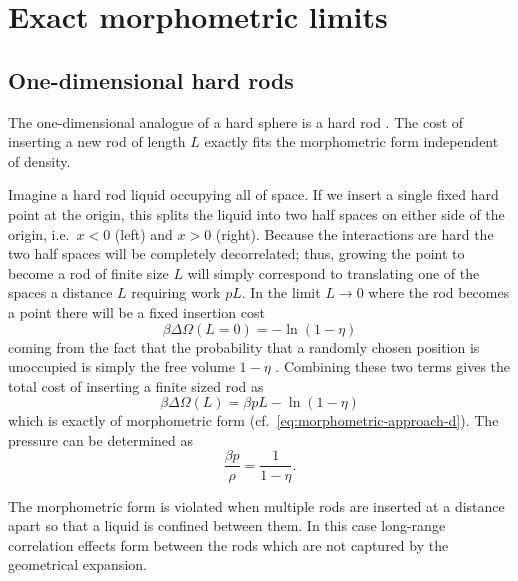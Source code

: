 \documentclass[11pt,twoside]{report}
\begin{document}
\section{Exact morphometric limits}

\subsection{One-dimensional hard rods}
\label{sec:hard-rods}

The one-dimensional analogue of a hard sphere is a hard rod
.
The cost of inserting a new rod of length $L$ exactly fits the morphometric form independent of density.

Imagine a hard rod liquid occupying all of space.
If we insert a single fixed hard point at the origin, this splits the liquid into two half spaces on either side of the origin, i.e.\ $x < 0$ (left) and $x > 0$ (right).
Because the interactions are hard the two half spaces will be completely decorrelated; thus, growing the point to become a rod of finite size $L$ will simply correspond to translating one of the spaces a distance $L$ requiring work $p L$.
In the limit $L \to 0$ where the rod becomes a point there will be a fixed insertion cost
\begin{equation*}
  \beta \Delta \Omega(L=0) = -\ln{(1-\eta)}
\end{equation*}
coming from the fact that the probability that a randomly chosen position is unoccupied is simply the free volume $1-\eta$ \cite{ReissJCP1959}.
Combining these two terms gives the total cost of inserting a finite sized rod as
\begin{equation}\label{eq:hard-rods-morphometric}
  \beta \Delta \Omega(L) = \beta p L - \ln{(1-\eta)}
\end{equation}
which is exactly of morphometric form (cf.\ \eqref{eq:morphometric-approach-d}).
The pressure can be determined as \cite{TonksPR1936}
\begin{equation}\label{eq:hard-rods-eos}
  \frac{\beta p}{\rho} = \frac{1}{1 - \eta}.
\end{equation}

The morphometric form is violated when multiple rods are inserted at a distance apart so that a liquid is confined between them.
In this case long-range correlation effects form between the rods which are not captured by the geometrical expansion.
\end{document}

